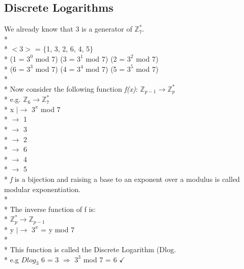 \documentclass[11pt]{article}
\begin{document}
\subsection{Discrete Logarithms}
We already know that 3 is a generator of $\mathbb{Z}^*_7$.\\*\\*
$<$3$>$ = $\{$1, 3, 2, 6, 4, 5$\}$\\*
\indent (1 = $3^0$ mod 7) \indent (3 = $3^1$ mod 7) \indent (2 = $3^2$ mod 7)\\*
\indent (6 = $3^3$ mod 7) \indent (4 = $3^4$ mod 7) \indent (5 = $3^5$ mod
7)\\*\\* Now consider the following function \emph{f(x)}:
$\mathbb{Z}_{p-1} \rightarrow \mathbb{Z}^*_p$\\*
e.g. $\mathbb{Z}_{6} \rightarrow \mathbb{Z}^*_7$\\*
\indent x $\mid \rightarrow$ $3^x$ mod 7\\*
 $\rightarrow$ 1\\*
 $\rightarrow$ 3\\*
 $\rightarrow$ 2\\*
 $\rightarrow$ 6\\*
 $\rightarrow$ 4\\*
 $\rightarrow$ 5\\*
\emph{f} is a bijection and raising a base to an exponent over a
modulus is called modular exponentiation.\\*\\*
The inverse function of f is:\\*
$\mathbb{Z}^*_p \rightarrow \mathbb{Z}_{p-1}$\\*
y $\mid \rightarrow$  $3^x$ = y mod 7\\*\\*
This function is called the Discrete Logarithm (Dlog.\\*
e.g \indent $Dlog_3$ 6  = 3 $\Longrightarrow$ $3^3$ mod 7 = 6 $\checkmark$
\end{document}
